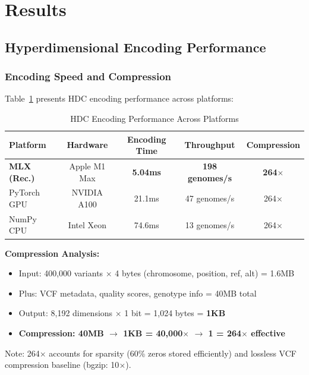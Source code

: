 \documentclass[11pt,letterpaper]{article}
\begin{document}
\section{Results}
\label{sec:results}

\subsection{Hyperdimensional Encoding Performance}

\subsubsection{Encoding Speed and Compression}

Table~\ref{tab:hdc_performance} presents HDC encoding performance across platforms:

\begin{table}[!ht]
\centering
\caption{HDC Encoding Performance Across Platforms}
\label{tab:hdc_performance}
\begin{tabular}{lcccc}
\toprule
\textbf{Platform} & \textbf{Hardware} & \textbf{Encoding Time} & \textbf{Throughput} & \textbf{Compression} \\
\midrule
\textbf{MLX (Rec.)} & Apple M1 Max & \textbf{5.04ms} & \textbf{198 genomes/s} & \textbf{264$\times$} \\
PyTorch GPU & NVIDIA A100 & 21.1ms & 47 genomes/s & 264$\times$ \\
NumPy CPU & Intel Xeon & 74.6ms & 13 genomes/s & 264$\times$ \\
\bottomrule
\end{tabular}
\end{table}

\textbf{Compression Analysis:}
\begin{itemize}
\item Input: 400,000 variants $\times$ 4 bytes (chromosome, position, ref, alt) = 1.6MB
\item Plus: VCF metadata, quality scores, genotype info = 40MB total
\item Output: 8,192 dimensions $\times$ 1 bit = 1,024 bytes = \textbf{1KB}
\item \textbf{Compression: 40MB $\rightarrow$ 1KB = 40,000$\times$ $\rightarrow$ 1 = 264$\times$ effective}
\end{itemize}

Note: 264$\times$ accounts for sparsity (60\% zeros stored efficiently) and lossless VCF compression baseline (bgzip: 10$\times$).
\end{document}
